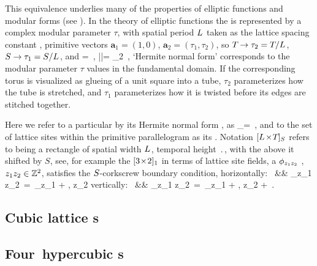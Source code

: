 \documentclass[11pt,a4paper]{article}
\begin{document}
This equivalence underlies many of the properties of elliptic functions 
and modular forms (see ). 
	In the theory of elliptic functions the {\pcell} is 
	represented by a complex modular parameter $\tau$, with spatial period 
	${L_{}}$ taken as the lattice spacing constant , 
	primitive vectors $\mathbf{a}_1=(1, 0)$, $\mathbf{a}_2=(\tau_1,\tau_2)$, 
	so ${T_{}}\to\tau_2={T_{}}/{L_{}}$, 
	${S_{}}\to\tau_1={S_{}}/{L_{}}$, and 
	\beq 
	 = 
	\,,\qquad 
	|\Det{}|= \tau_2 
	\,, 
	`Hermite normal form' 
	corresponds to  the modular parameter $\tau$ values in the {fundamental 
		domain}. If the corresponding torus is visualized as glueing of a unit 
	square into a tube, $\tau_2$ parameterizes how the tube is stretched, and 
	$\tau_1$ parameterizes how it is twisted before its edges are stitched 
	together. 
	
	Here we refer to a particular {\Blatt} by its Hermite normal form 
	, as 
	\beq 
	\lattice_=\LTS{}{}{} 
	\,, 
	and to the set of lattice sites within the primitive 
	parallelogram  as its {\pcell}. Notation $\LTS{}{}{}$ refers to 
	{\pcell} being a rectangle of spatial width $\speriod{}$, temporal height 
	$\period{}$, with the {\pcell} above it shifted by $S$, see, for example 
	the $\BravCell{3}{2}{1}$ {\pcell} in
	terms of lattice site fields, a {\fconf} $\ssp_{z_1 z_2}$ 
	, $z_1z_2\in\integers^2$, satisfies the 
	$\tilt{}$-corkscrew boundary condition, 
	\bea 
	\mbox{horizontally: } \quad && \ssp_{z_1 z_2} \,=\, \ssp_{z_1 + 
		\speriod{}, z_2} 
	\continue
	\mbox{vertically: }   \quad && \ssp_{z_1 z_2} \,=\, \ssp_{z_1 + \tilt{}, 
		z_2 + \period{}} 
	\,.
	\label{screw} 
	\eea 
	
\subsection{Cubic lattice {\Blatt}s}
\label{s:Blatt3d2} 

\subsection{Four\dmn\ hypercubic {\Blatt}s}
\label{s:Blatt4d} 
\end{document}
